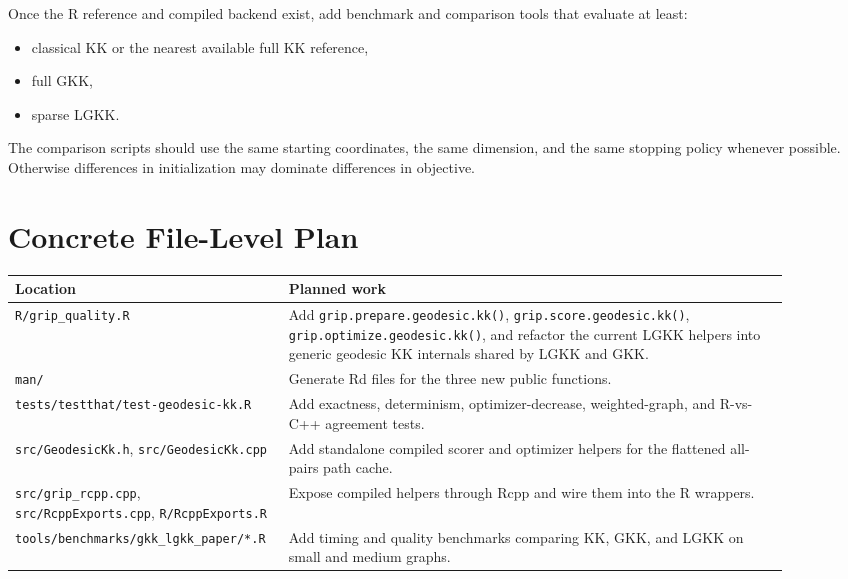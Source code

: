 \documentclass[11pt]{article}
\begin{document}
Once the R reference and compiled backend exist, add benchmark and comparison
tools that evaluate at least:
\begin{itemize}[leftmargin=1.5em]
\item classical KK or the nearest available full KK reference,
\item full GKK,
\item sparse LGKK.
\end{itemize}

The comparison scripts should use the same starting coordinates, the same
dimension, and the same stopping policy whenever possible. Otherwise differences
in initialization may dominate differences in objective.

\section{Concrete File-Level Plan}

\begin{center}
\begin{tabular}{>{\raggedright\arraybackslash}p{0.28\linewidth} >{\raggedright\arraybackslash}p{0.62\linewidth}}
\toprule
Location & Planned work \\
\midrule
\texttt{R/grip\_quality.R} &
Add \texttt{grip.prepare.geodesic.kk()},
\texttt{grip.score.geodesic.kk()},
\texttt{grip.optimize.geodesic.kk()}, and refactor the current LGKK helpers into
generic geodesic KK internals shared by LGKK and GKK. \\
\addlinespace
\texttt{man/} &
Generate Rd files for the three new public functions. \\
\addlinespace
\texttt{tests/testthat/}\newline\texttt{test-geodesic-kk.R} &
Add exactness, determinism, optimizer-decrease, weighted-graph, and R-vs-C++
agreement tests. \\
\addlinespace
\texttt{src/GeodesicKk.h}, \texttt{src/GeodesicKk.cpp} &
Add standalone compiled scorer and optimizer helpers for the flattened all-pairs
path cache. \\
\addlinespace
\texttt{src/grip\_rcpp.cpp}, \texttt{src/RcppExports.cpp}, \texttt{R/RcppExports.R} &
Expose compiled helpers through Rcpp and wire them into the R wrappers. \\
\addlinespace
\texttt{tools/benchmarks/gkk\_lgkk\_paper/*.R} &
Add timing and quality benchmarks comparing KK, GKK, and LGKK on small and
medium graphs. \\
\bottomrule
\end{tabular}
\end{center}
\end{document}
